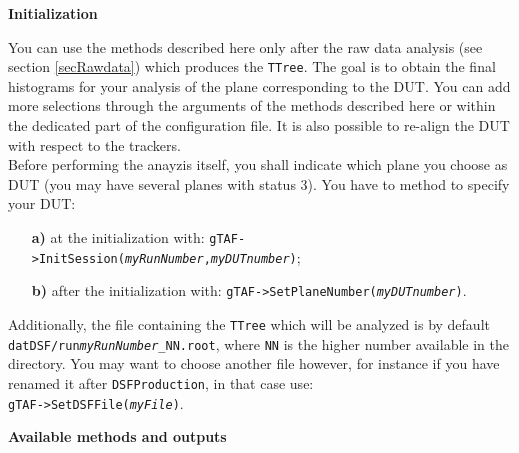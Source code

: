 \documentclass[a4paper, 12pt, twoside]{article}
\begin{document}
\noindent
{\bf Initialization}

\noindent
You can use the methods described here only after the raw data analysis (see section \ref{secRawdata}) which produces the {\tt TTree}. The goal is to obtain the final histograms for your analysis of the plane corresponding to the DUT. You can add more selections through the arguments of the methods described here or within the dedicated part of the configuration file. It is also possible to re-align the DUT with respect to the trackers.\\
Before performing the anayzis itself, you shall indicate which plane you choose as DUT (you may have several planes with status 3). You have to method to specify your DUT:
\begin{itemize}
\item[{\bf a)}] at the initialization with: {\tt gTAF->InitSession({\it myRunNumber},{\it myDUTnumber})};
\item[{\bf b)}] after the initialization with: {\tt gTAF->SetPlaneNumber({\it myDUTnumber})}.
\end{itemize}
Additionally, the file containing the {\tt TTree} which will be analyzed is by default {\tt datDSF/run{\it{myRunNumber}}\_{NN}.root}, where {\tt NN} is the higher number available in the directory. You may want to choose another file however, for instance if you have renamed it after {\tt DSFProduction}, in that case use:\\
{\tt gTAF->SetDSFFile({\it myFile})}.\\


\vspace{0.8 cm}

\noindent
{\bf Available methods and outputs}
\end{document}
